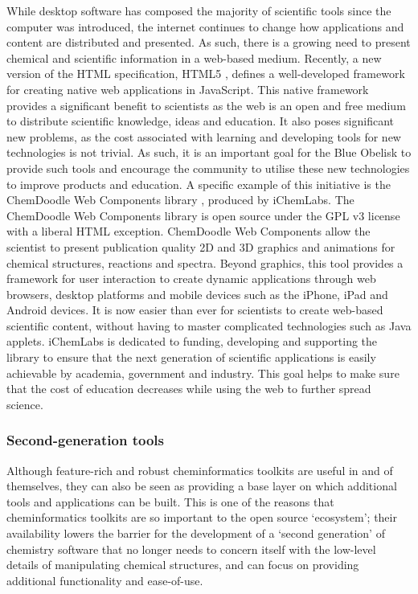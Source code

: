 \documentclass[10pt]{bmc_article}
\newenvironment{bmcformat}{\begin{raggedright}\baselineskip20pt\sloppy\setboolean{publ}{false}}{\end{raggedright}\baselineskip20pt\sloppy}
\begin{document}
\begin{bmcformat}
While desktop software has composed the majority of scientific tools since the computer was introduced, the internet continues to change how applications and content are distributed and presented. As such, there is a growing need to present chemical and scientific information in a web-based medium. Recently, a new version of the HTML specification, HTML5 \cite{html5}, defines a well-developed framework for creating native web applications in JavaScript. This native framework provides a significant benefit to scientists as the web is an open and free medium to distribute scientific knowledge, ideas and education. It also poses significant new problems, as the cost associated with learning and developing tools for new technologies is not trivial. As such, it is an important goal for the Blue Obelisk to provide such tools and encourage the community to utilise these new technologies to improve products and education. A specific example of this initiative is the ChemDoodle Web Components library \cite{ChemDoodleWeb}, produced by iChemLabs. The ChemDoodle Web Components library is open source under the GPL v3 license with a liberal HTML exception. ChemDoodle Web Components allow the scientist to present publication quality 2D and 3D graphics and animations for chemical structures, reactions and spectra. Beyond graphics, this tool provides a framework for user interaction to create dynamic applications through web browsers, desktop platforms and mobile devices such as the iPhone, iPad and Android devices. It is now easier than ever for scientists to create web-based scientific content, without having to master complicated technologies such as Java applets. iChemLabs is dedicated to funding, developing and supporting the library to ensure that the next generation of scientific applications is easily achievable by academia, government and industry. This goal helps to make sure that the cost of education decreases while using the web to further spread science.

\subsubsection*{Second-generation tools}

Although feature-rich and robust cheminformatics toolkits are useful
in and of themselves, they can also be seen as providing a base layer
on which additional tools and applications can be built. This is one
of the reasons that cheminformatics toolkits are so important to the
open source `ecosystem'; their availability lowers the barrier for the
development of a `second generation' of chemistry software that no
longer needs to concern itself with the low-level details of
manipulating chemical structures, and can focus on providing
additional functionality and ease-of-use.


\end{bmcformat}
\end{document}
